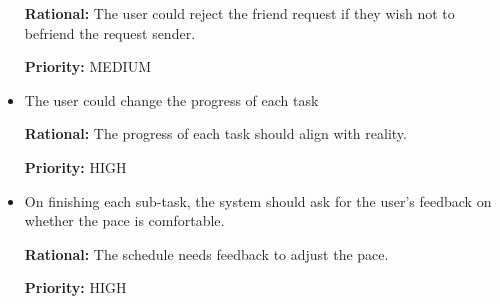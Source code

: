 \documentclass[12pt]{article}
\newcounter{reqnum} %
\newcommand{\rthereqnum}{FR\refstepcounter{reqnum}\thereqnum:}
\begin{document}
\begin{itemize}
\textbf{Rational:} The user could reject the friend request if they wish not to befriend the request sender.

\textbf{Priority:} MEDIUM
\item[\rthereqnum]
The user could change the progress of each task

\textbf{Rational:} The progress of each task should align with reality.

\textbf{Priority:} HIGH
\item[\rthereqnum]
On finishing each sub-task, the system should ask for the user's feedback on whether the pace is comfortable.

\textbf{Rational:} The schedule needs feedback to adjust the pace.

\textbf{Priority:} HIGH
\end{itemize}
\end{document}

